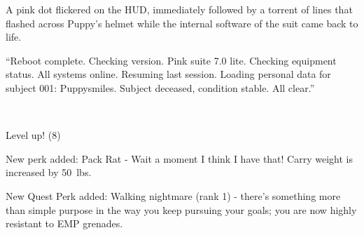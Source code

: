 
A pink dot flickered on the HUD, immediately followed by a torrent of lines that flashed across Puppy's helmet while the internal software of the suit came back to life.

{\mt ``Reboot complete. Checking version. Pink suite 7.0 lite. Checking equipment status. All systems online. Resuming last session. Loading personal data for subject 001: Puppysmiles. Subject deceased, condition stable. All clear.''}

\clearpage %

~\vfill

\begin{engnote}
		Level up! (8)
	
		New perk added: Pack Rat - Wait a moment I think I have that! Carry weight is increased by \SI{50}{lbs}.
	
		New Quest Perk added: Walking nightmare (rank 1) - there's something more than simple purpose in the way you keep pursuing your goals; you are now highly resistant to EMP grenades.
\end{engnote}

